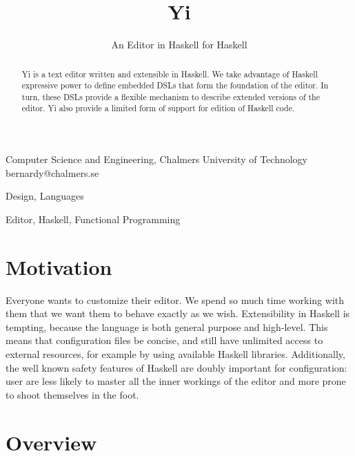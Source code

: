\documentclass[9pt,indentedstyle,preprint]{sigplanconf}
\begin{document}
\copyrightdata{[to be supplied]} 


\title{Yi}
\subtitle{An Editor in Haskell for Haskell}

           {Computer Science and Engineering, 
            Chalmers University of Technology
          }
           {bernardy@chalmers.se}

\maketitle

\begin{abstract}
  Yi is a text editor written and extensible in Haskell. We take
  advantage of Haskell expressive power to define embedded DSLs that form the
  foundation of the editor. In turn, these DSLs provide a flexible
  mechanism to describe extended versions of the editor. Yi also
  provide a limited form of support for edition of Haskell code.
\end{abstract}


\terms
Design, Languages

\keywords
Editor, Haskell, Functional Programming

\section{Motivation}

Everyone wants to customize their editor. We spend so much time
working with them that we want them to behave exactly as we wish.
Extensibility in Haskell is tempting, because the language is both
general purpose and high-level. This means that configuration files be
concise, and still have unlimited access to external resources, for
example by using available Haskell libraries. Additionally, the well
known safety features of Haskell are doubly important for
configuration: user are less likely to master all the inner workings
of the editor and more prone to shoot themselves in the foot.

\section{Overview}
\end{document}
